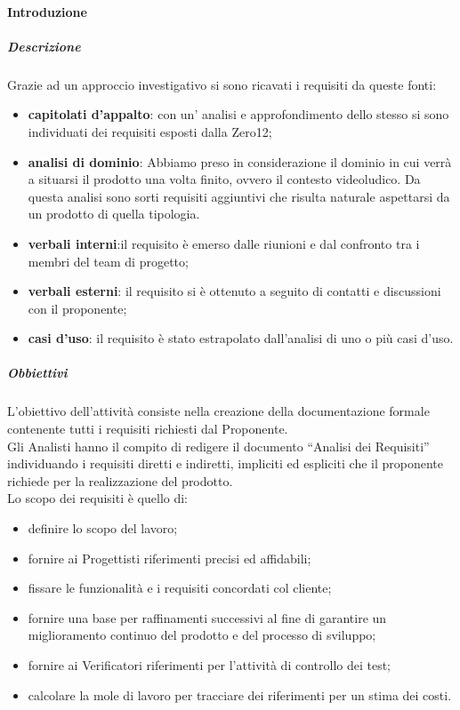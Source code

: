 			\paragraph{Introduzione}
				\subparagraph{Descrizione}
					Grazie ad un approccio investigativo si sono ricavati i requisiti da queste fonti:\\
					\begin{itemize}
						\item\textbf{capitolati d’appalto}: con un’ analisi e approfondimento dello stesso si sono individuati dei requisiti esposti dalla Zero12;
						\item\textbf{analisi di dominio}: Abbiamo preso in considerazione il dominio in cui verrà a situarsi il prodotto una volta finito, ovvero il contesto videoludico. Da questa analisi sono sorti requisiti aggiuntivi che risulta naturale aspettarsi da un prodotto di quella tipologia.
						\item\textbf{verbali interni}:il requisito è emerso dalle riunioni e dal confronto tra i membri del team di progetto;
						\item\textbf{verbali esterni}: il requisito si è ottenuto a seguito di contatti e discussioni con il proponente;
						\item\textbf{casi d’uso}: il requisito è stato estrapolato dall'analisi di uno o più casi d’uso.
					\end{itemize}
				\subparagraph{Obbiettivi}
					L’obiettivo dell'attività consiste nella creazione della documentazione formale contenente tutti i requisiti richiesti dal Proponente.\\
					Gli Analisti hanno il compito di redigere il documento “Analisi dei Requisiti” individuando i requisiti diretti e indiretti, impliciti ed espliciti che il proponente richiede per la realizzazione del prodotto.\\
					Lo scopo dei requisiti è quello di:\\
					\begin{itemize}
						\item definire lo scopo del lavoro;
						\item fornire ai Progettisti riferimenti precisi ed affidabili;
						\item fissare le funzionalità e i requisiti concordati col cliente;
						\item fornire una base per raffinamenti successivi al fine di garantire un miglioramento continuo del prodotto e del processo di sviluppo;
						\item fornire ai Verificatori riferimenti per l'attività di controllo dei test;
						\item calcolare la mole di lavoro per tracciare dei riferimenti per un stima dei costi.
					\end{itemize}
